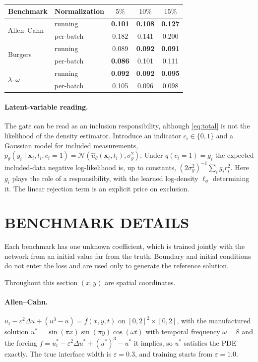\documentclass[twoside]{article}
\begin{document}
\begin{center}\small
\begin{tabular}{llccc}
\toprule
Benchmark & Normalization & $5\%$ & $10\%$ & $15\%$ \\
\midrule
\multirow{2}{*}{Allen--Cahn}
 & running & \textbf{0.101} & \textbf{0.108} & \textbf{0.127} \\
 & per-batch & 0.182 & 0.141 & 0.200 \\
\midrule
\multirow{2}{*}{Burgers}
 & running & 0.089 & \textbf{0.092} & \textbf{0.091} \\
 & per-batch & \textbf{0.086} & 0.101 & 0.111 \\
\midrule
\multirow{2}{*}{$\lambda$--$\omega$}
 & running & \textbf{0.092} & \textbf{0.092} & \textbf{0.095} \\
 & per-batch & 0.105 & 0.096 & 0.098 \\
\bottomrule
\end{tabular}
\end{center}

\paragraph{Latent-variable reading.}
The gate can be read as an inclusion responsibility, although \cref{eq:total}
is not the likelihood of the density estimator. Introduce an indicator
$c_i \in \{0,1\}$ and a Gaussian model for included measurements,
$p_\theta(y_i \mid \mathbf{x}_i, t_i, c_i{=}1) =
\mathcal{N}(\hat u_\theta(\mathbf{x}_i, t_i), \sigma_y^2)$. Under
$q(c_i{=}1) = g_i$ the expected included-data negative log-likelihood is, up to
constants, $(2\sigma_y^2)^{-1}\sum_i g_i r_i^2$. Here $g_i$ plays the role of a
responsibility, with the learned log-density $\ell_\phi$ determining it. The
linear rejection term is an explicit price on exclusion.

\section{BENCHMARK DETAILS}
\label{app:benchmarks}

Each benchmark has one unknown coefficient, which is trained jointly with the
network from an initial value far from the truth. Boundary and initial
conditions do not enter the loss and are used only to generate the reference
solution.

Throughout this section $(x, y)$ are spatial coordinates.

\paragraph{Allen--Cahn.}
$u_t - \varepsilon^2 \Delta u + (u^3 - u) = f(x,y,t)$ on $[0,2]^2 \times [0,2]$,
with the manufactured solution $u^* = \sin(\pi x)\sin(\pi y)\cos(\omega t)$ with temporal
frequency $\omega = 8$ and
the forcing $f = u^*_t - \varepsilon^2\Delta u^* + (u^*)^3 - u^*$ it implies, so
$u^*$ satisfies the PDE exactly. The true interface width is
$\varepsilon = 0.3$, and training starts from $\varepsilon = 1.0$.
\end{document}

